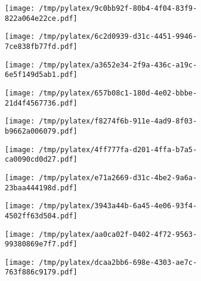 \documentclass{article}
\begin{document}
\begin{figure}[htbp]
\begin{subfigure}[b]{.3\linewidth}
\texttt{[image: /tmp/pylatex/9c0bb92f-80b4-4f04-83f9-822a064e22ce.pdf]}
\end{subfigure}
\begin{subfigure}[b]{.3\linewidth}
\texttt{[image: /tmp/pylatex/6c2d0939-d31c-4451-9946-7ce838fb77fd.pdf]}
\end{subfigure}
\begin{subfigure}[b]{.3\linewidth}
\texttt{[image: /tmp/pylatex/a3652e34-2f9a-436c-a19c-6e5f149d5ab1.pdf]}
\end{subfigure}
\begin{subfigure}[b]{.3\linewidth}
\texttt{[image: /tmp/pylatex/657b08c1-180d-4e02-bbbe-21d4f4567736.pdf]}
\end{subfigure}
\begin{subfigure}[b]{.3\linewidth}
\texttt{[image: /tmp/pylatex/f8274f6b-911e-4ad9-8f03-b9662a006079.pdf]}
\end{subfigure}
\begin{subfigure}[b]{.3\linewidth}
\texttt{[image: /tmp/pylatex/4ff777fa-d201-4ffa-b7a5-ca0090cd0d27.pdf]}
\end{subfigure}
\begin{subfigure}[b]{.3\linewidth}
\texttt{[image: /tmp/pylatex/e71a2669-d31c-4be2-9a6a-23baa444198d.pdf]}
\end{subfigure}
\begin{subfigure}[b]{.3\linewidth}
\texttt{[image: /tmp/pylatex/3943a44b-6a45-4e06-93f4-4502ff63d504.pdf]}
\end{subfigure}
\begin{subfigure}[b]{.3\linewidth}
\texttt{[image: /tmp/pylatex/aa0ca02f-0402-4f72-9563-99380869e7f7.pdf]}
\end{subfigure}
\begin{subfigure}[b]{.3\linewidth}
\texttt{[image: /tmp/pylatex/dcaa2bb6-698e-4303-ae7c-763f886c9179.pdf]}
\end{subfigure}
\end{figure}
\end{document}

